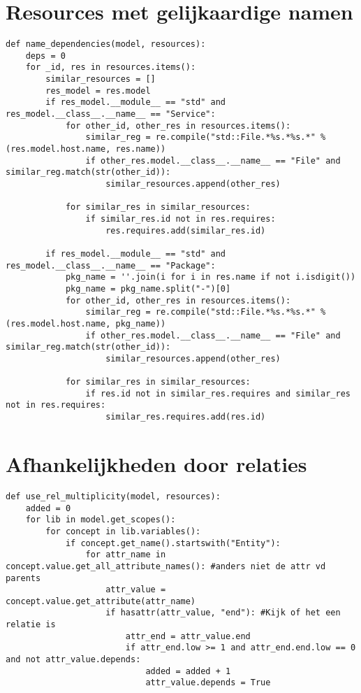 \section{Resources met gelijkaardige namen}
\begin{minipage}{\textwidth}
\begin{lstlisting}
def name_dependencies(model, resources):
    deps = 0
    for _id, res in resources.items():
        similar_resources = []
        res_model = res.model
        if res_model.__module__ == "std" and res_model.__class__.__name__ == "Service":
            for other_id, other_res in resources.items():
                similar_reg = re.compile("std::File.*%s.*%s.*" % (res.model.host.name, res.name))
                if other_res.model.__class__.__name__ == "File" and similar_reg.match(str(other_id)):
                    similar_resources.append(other_res)
            
            for similar_res in similar_resources:
                if similar_res.id not in res.requires:
                    res.requires.add(similar_res.id)
 
        if res_model.__module__ == "std" and res_model.__class__.__name__ == "Package":
            pkg_name = ''.join(i for i in res.name if not i.isdigit())
            pkg_name = pkg_name.split("-")[0]
            for other_id, other_res in resources.items():
                similar_reg = re.compile("std::File.*%s.*%s.*" % (res.model.host.name, pkg_name))
                if other_res.model.__class__.__name__ == "File" and similar_reg.match(str(other_id)):
                    similar_resources.append(other_res)
            
            for similar_res in similar_resources:
                if res.id not in similar_res.requires and similar_res not in res.requires:
                    similar_res.requires.add(res.id)
\end{lstlisting}
\end{minipage}

\section{Afhankelijkheden door relaties}
\begin{minipage}{\textwidth}
\begin{lstlisting}
def use_rel_multiplicity(model, resources):
    added = 0
    for lib in model.get_scopes():
        for concept in lib.variables():
            if concept.get_name().startswith("Entity"):
                for attr_name in concept.value.get_all_attribute_names(): #anders niet de attr vd parents
                    attr_value = concept.value.get_attribute(attr_name)
                    if hasattr(attr_value, "end"): #Kijk of het een relatie is
                        attr_end = attr_value.end
                        if attr_end.low >= 1 and attr_end.end.low == 0 and not attr_value.depends:
                            added = added + 1
                            attr_value.depends = True 
\end{lstlisting}
\end{minipage}

